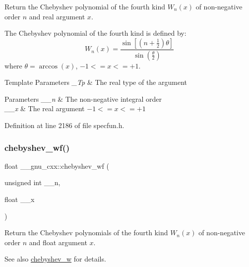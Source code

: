 Return the Chebyshev polynomial of the fourth kind $ W_n(x) $ of non-\/negative order $ n $ and real argument $ x $.

The Chebyshev polynomial of the fourth kind is defined by\+: \[ W_n(x) = \frac{\sin \left[ \left(n+\frac{1}{2}\right)\theta \right]} {\sin \left(\frac{\theta}{2}\right)} \] where $ \theta = \arccos(x) $, $ -1 <= x <= +1 $.


\begin{DoxyTemplParams}{Template Parameters}
{\em \+\_\+\+Tp} & The real type of the argument \\
\hline
\end{DoxyTemplParams}

\begin{DoxyParams}{Parameters}
{\em \+\_\+\+\_\+n} & The non-\/negative integral order \\
\hline
{\em \+\_\+\+\_\+x} & The real argument $ -1 <= x <= +1 $ \\
\hline
\end{DoxyParams}


Definition at line 2186 of file specfun.\+h.

\mbox{\label{group__gnu__math__spec__func_gae6d468cee53df584e40afe294127b090}} 
\subsubsection{\texorpdfstring{chebyshev\+\_\+wf()}{chebyshev\_wf()}}
{\footnotesize\ttfamily float \+\_\+\+\_\+gnu\+\_\+cxx\+::chebyshev\+\_\+wf (\begin{DoxyParamCaption}\item[{unsigned int}]{\+\_\+\+\_\+n,  }\item[{float}]{\+\_\+\+\_\+x }\end{DoxyParamCaption})\hspace{0.3cm}{\ttfamily [inline]}}

Return the Chebyshev polynomials of the fourth kind $ W_n(x) $ of non-\/negative order $ n $ and {\ttfamily float} argument $ x $.

\begin{DoxySeeAlso}{See also}
\hyperlink{group__gnu__math__spec__func_gaa156c6c21e99104ebcb627e92aceada0}{chebyshev\+\_\+w} for details. 
\end{DoxySeeAlso}


